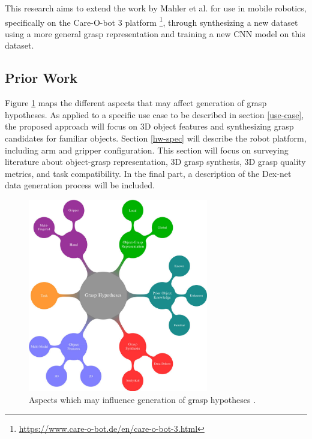 \documentclass[12pt]{article}
\begin{document}
    This research aims to extend the work by Mahler et al. \cite{mahler2017} for use in mobile robotics, specifically on the Care-O-bot 3 platform \footnote{\url{https://www.care-o-bot.de/en/care-o-bot-3.html}}, through synthesizing a new dataset using a more general grasp representation and training a new CNN model on this dataset.

    \subsection{Prior Work}

    Figure \ref{fig:grasp_synthesis_mind_map} maps the different aspects that may affect generation of grasp hypotheses. As applied to a specific use case to be described in section \ref{use-case}, the proposed approach will focus on 3D object features and synthesizing grasp candidates for familiar objects. Section \ref{hw-spec} will describe the robot platform, including arm and gripper configuration. This section will focus on surveying literature about object-grasp representation, 3D grasp synthesis, 3D grasp quality metrics, and task compatibility. In the final part, a description of the Dex-net data generation process will be included.

    \begin{figure}[H]
        \centering
        \includegraphics[width=0.7\textwidth]{bohg14-grasp_synthesis_mind_map}
        \caption{Aspects which may influence generation of grasp hypotheses \cite{Bohg2014}.}
        \label{fig:grasp_synthesis_mind_map}
    \end{figure}
\end{document}
